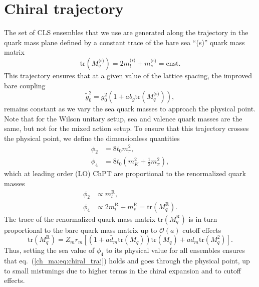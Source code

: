 
\section{Chiral trajectory}
\label{ch_ma:sec:chiral_traj}

The set of CLS ensembles that we use are generated along the trajectory in the quark mass plane defined by a constant trace of the bare sea ``(s)'' quark mass matrix
\begin{equation}
\label{ch_ma:eq:chiral_traj}
{\textrm{tr}}\left(M_q^{\textrm{(s)}}\right)=2m_l^{\textrm{(s)}}+m_s^{\textrm{(s)}}={\textrm{cnst}}.
\end{equation}
This trajectory ensures that at a given value of the lattice spacing, the improved bare coupling 
\begin{equation}
\tilde{g}_0^2=g_0^2\left(1+ab_g{\textrm{tr}}\left(M_q^{\textrm{(s)}}\right)\right),
\end{equation}
remains constant as we vary the sea quark masses to approach the physical point. Note that for the Wilson unitary setup, sea and valence quark masses are the same, but not for the mixed action setup. To ensure that this trajectory crosses the physical point, we define the dimensionless quantities
\begin{align}
\label{ch_ma:eq:phi2}
\phi_2&=8t_0m_{\pi}^2,\\
\label{ch_ma:eq:phi4}
\phi_4&=8t_0\left(m_K^2+\frac{1}{2}m_{\pi}^2\right),
\end{align}
which at leading order (LO) ChPT are proportional to the renormalized quark masses
\begin{align}
\phi_2&\propto m_l^{\textrm{R}},\\
\phi_4&\propto2m_l^{\textrm{R}}+m_s^{\textrm{R}}={\textrm{tr}}\left(M_q^{\textrm{R}}\right).
\end{align}
The trace of the renormalized quark mass matrix ${\textrm{tr}}\left(M_q^{\textrm{R}}\right)$ is in turn proportional to the bare quark mass matrix up to $\mathcal{O}(a)$ cutoff effects
\begin{equation}
{\textrm{tr}}\left(M_q^{\textrm{R}}\right)=Z_mr_m\left[\left(1+a\bar{d}_m{\textrm{tr}}\left(M_q\right)\right){\textrm{tr}}\left(M_q\right)+ad_m{\textrm{tr}}\left(M_q^2\right)\right].
\end{equation}
Thus, setting the sea value of $\phi_4$ to its physical value for all ensembles ensures that eq.~(\ref{ch_ma:eq:chiral_traj}) holds and goes through the physical point, up to small mistunings due to higher terms in the chiral expansion and to cutoff effects. 

